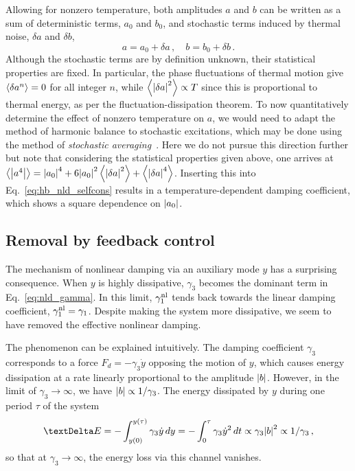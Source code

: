 Allowing for nonzero temperature, both amplitudes $a$ and $b$ can be written as a sum of deterministic terms, $a_0$ and $b_0$, and stochastic terms induced by thermal noise, $\delta a$ and $\delta b$,
\begin{equation}
a = a_0 + \delta a \,, \quad b = b_0 + \delta b \,. 
\end{equation} 
Although the stochastic terms are by definition unknown, their statistical properties are fixed. In particular, the phase fluctuations of thermal motion give $\expval{\delta a^n} = 0$ for all integer $n$, while $\expval{ \abs{\delta a}^2} \propto T $ since this is proportional to thermal energy, as per the fluctuation-dissipation theorem. To now quantitatively determine the effect of nonzero temperature on $a$, we would need to adapt the method of harmonic balance to stochastic excitations, which may be done using the method of \textit{stochastic averaging}~\cite{Roberts_1986, Khasminskii_1966, Toni_thesis}. Here we do not pursue this direction further but note that considering the statistical properties given above, one arrives at $\expval{\abs{a^4}} = \abs{a_0}^4 + 6 \abs{a_0}^2 \expval{ \abs{\delta a}^2} + \expval{\abs{\delta a}^4}$. Inserting this into Eq.~\eqref{eq:hb_nld_selfcons} results in a temperature-dependent damping coefficient, which shows a square dependence on $\abs{a_0}$.
\subsection{Removal by feedback control} \label{sec:hb_damping_the_damping}

The mechanism of nonlinear damping via an auxiliary mode $y$ has a surprising consequence. When $y$ is highly dissipative, $\gamma_3$ becomes the dominant term in Eq.~\eqref{eq:nld_gamma}. In this limit, $\gamma_1^{\rm nl}$ tends back towards the linear damping coefficient, $\gamma_1^{\rm nl} = \gamma_1$. Despite making the system more dissipative, we seem to have removed the effective nonlinear damping.

The phenomenon can be explained intuitively. The damping coefficient $\gamma_3$ corresponds to a force $F_{d} = - \gamma_3 \dot{y}$ opposing the motion of $y$, which causes energy dissipation at a rate linearly proportional to the amplitude $\abs{b}$. However, in the limit of $\gamma_3 \rightarrow \infty$, we have $ \abs{b} \propto 1/\gamma_3$.
The energy dissipated by $y$ during one period $\tau$ of the system
\begin{equation}
\Delta E = -\int_{y(0)}^{y(\tau)} \gamma_3 \dot{y} \, dy = -\int_0^\tau \gamma_3 \dot{y}^2  \, dt\propto \gamma_3 \abs{b}^2 \propto 1 / \gamma_3\, ,
\end{equation}
so that at $\gamma_3 \rightarrow \infty$, the energy loss via this channel vanishes. 

